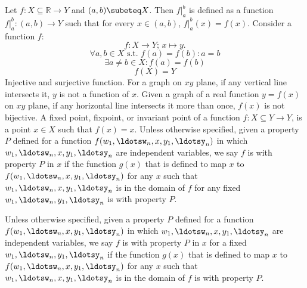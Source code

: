 \documentclass[a4paper,12pt]{report}
\begin{document}
Let $f\colon X\subseteq\mathbb{R}\to Y$ and $(a,b)\subeteq X$. Then $f\vert_a^b$ is defined as a function $f\vert_a^b\colon (a,b)\to Y$ such that for every $x\in (a,b)$, $f\vert_a^b(x)=f(x)$.
Consider a function $f$:
\[f\colon X\to Y;\,x\mapsto y.\]
\[\forall a,b\in X\text{\ s.t.\ } f(a)=f(b)\colon a=b\]
\[\exists a\neq b\in X\colon f(a)=f(b)\]
\[f(X)=Y\]
Injective and surjective function.
For a graph on $xy$ plane, if any vertical line intersects it, $y$ is not a function of $x$.
Given a graph of a real function $y=f(x)$ on $xy$ plane, if any horizontal line intersects it more than once, $f(x)$ is not bijective.
A fixed point, fixpoint, or invariant point of a function $f\colon X\subseteq Y\to Y$, is a point $x\in X$ such that $f(x)=x$.
Unless otherwise specified, given a property $P$ defined for a function $f(w_1,\ldotsw_n,x,y_1,\ldotsy_n)$ in which $w_1,\ldotsw_n,x,y_1,\ldotsy_n$ are independent variables, we say $f$ is with property $P$ in $x$ if the function $g(x)$ that is defined to map $x$ to $f(w_1,\ldotsw_n,x,y_1,\ldotsy_n)$ for any $x$ such that $w_1,\ldotsw_n,x,y_1,\ldotsy_n$ is in the domain of $f$ for any fixed $w_1,\ldotsw_n,y_1,\ldotsy_n$ is with property $P$.

Unless otherwise specified, given a property $P$ defined for a function $f(w_1,\ldotsw_n,x,y_1,\ldotsy_n)$ in which $w_1,\ldotsw_n,x,y_1,\ldotsy_n$ are independent variables, we say $f$ is with property $P$ in $x$ for a fixed $w_1,\ldotsw_n,y_1,\ldotsy_n$ if the function $g(x)$ that is defined to map $x$ to $f(w_1,\ldotsw_n,x,y_1,\ldotsy_n)$ for any $x$ such that $w_1,\ldotsw_n,x,y_1,\ldotsy_n$ is in the domain of $f$ is with property $P$.
\end{document}
